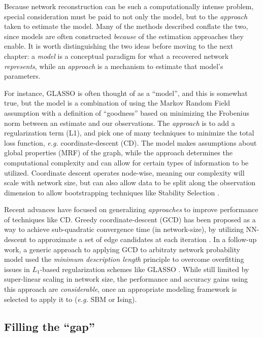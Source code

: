 \documentclass[%
	12pt,
		oneside,
		letterpaper
]{book}
\begin{document}
Because network reconstruction can be such a computationally intense
problem, special consideration must be paid to not only the model, but
to the \emph{approach} taken to estimate the model. Many of the methods
described conflate the two, since models are often constructed
\emph{because} of the estimation approaches they enable. It is worth
distinguishing the two ideas before moving to the next chapter: a
\emph{model} is a conceptual paradigm for what a recovered network
\emph{represents}, while an \emph{approach} is a mechanism to estimate
that model's parameters.

For instance, GLASSO is often thought of as a ``model'', and this is
somewhat true, but the model is a combination of using the Markov Random
Field assumption with a definition of ``goodness'' based on minimizing
the Frobenius norm between an estimate and our observations. The
\emph{approach} is to add a regularization term (L1), and pick one of
many techniques to minimize the total loss function, \emph{e.g.}
coordinate-descent (CD). The model makes assumptions about global
properties (MRF) of the graph, while the approach determines the
computational complexity and can allow for certain types of information
to be utilized. Coordinate descent operates node-wise, meaning our
complexity will scale with network size, but can also allow data to be
split along the observation dimension to allow bootstrapping techniques
like Stability Selection \autocite{StabilitySelection_Meinshausen2010}.

Recent advances have focused on generalizing \emph{approaches} to
improve performance of techniques like CD. Greedy coordinate-descent
(GCD) has been proposed as a way to achieve sub-quadratic convergence
time (in network-size), by utilizing NN-descent to approximate a set of
edge candidates at each iteration
\autocite{Scalablenetworkreconstruction_Peixoto2024}. In a follow-up
work, a generic approach to applying GCD to arbitraty network
probability model used the \emph{minimum description length} principle
to overcome overfitting issues in \(L_1\)-based regularization schemes
like GLASSO \autocite{Networkreconstructionvia_Peixoto2024}. While still
limited by super-linear scaling in network size, the performance and
accuracy gains using this approach are \emph{considerable}, once an
appropriate modeling framework is selected to apply it to (\emph{e.g.}
SBM or Ising).

\subsection{Filling the ``gap''}\label{filling-the-gap}
\end{document}
